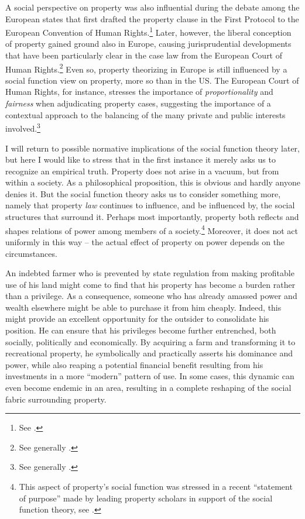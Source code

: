 \documentclass[12pt,a4paper]{book} %
\begin{document}
A social perspective on property was also influential during the debate among the European states that first drafted the property clause in the First Protocol to the European Convention of Human Rights.\footnote{See \cite[1063-1065]{allen10}.} Later, however, the liberal conception of property gained ground also in Europe, causing jurisprudential developments that have been particularly clear in the case law from the European Court of Human Rights.\footnote{See generally \cite{allen10}.} Even so, property theorizing in Europe is still influenced by a social function view on property, more so than in the US. The European Court of Human Rights, for instance, stresses the importance of {\it proportionality} and {\it fairness} when adjudicating property cases, suggesting the importance of a contextual approach to the balancing of the many private and public interests involved.\footnote{See generally \cite[Chapter 5]{allen05}.}

I will return to possible normative implications of the social function theory later, but here I would like to stress that in the first instance it merely asks us to recognize an empirical truth. Property does not arise in a vacuum, but from within a society. As a philosophical proposition, this is obvious and hardly anyone denies it. But the social function theory asks us to consider something more, namely that property {\it law} continues to influence, and be influenced by, the social structures that surround it. Perhaps most importantly, property both reflects and shapes relations of power among members of a society.\footnote{This aspect of property's social function was stressed in a recent ``statement of purpose'' made by leading property scholars in support of the social function theory, see \cite{alexander09a}.} Moreover, it does not act uniformly in this way -- the actual effect of property on power depends on the circumstances.

An indebted farmer who is prevented by state regulation from making profitable use of his land might come to find that his property has become a burden rather than a privilege. As a consequence, someone who has already amassed power and wealth elsewhere might be able to purchase it from him cheaply. Indeed, this might provide an excellent opportunity for the outsider to consolidate his position. He can ensure that his privileges become further entrenched, both socially, politically and economically. By acquiring a farm and transforming it to recreational property, he symbolically and practically asserts his dominance and power, while also reaping a potential financial benefit resulting from his investments in a more ``modern'' pattern of use. In some cases, this dynamic can even become endemic in an area, resulting in a complete reshaping of the social fabric surrounding property.
\end{document}
